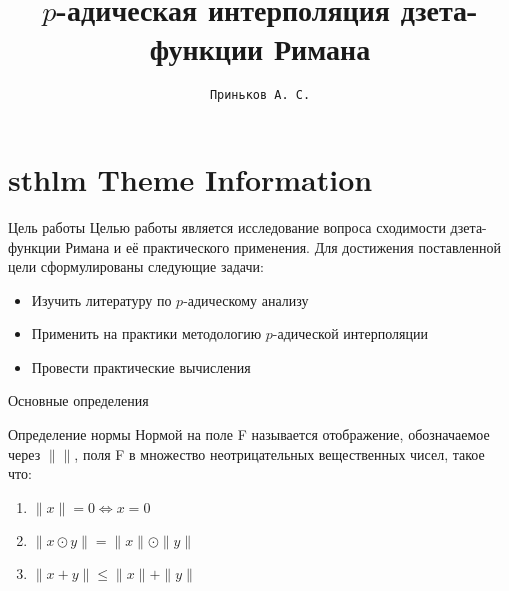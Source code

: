 \documentclass[newPxFont,sthlmFooter]{beamer}
\title{$p$-адическая интерполяция дзета-функции Римана}
\subtitle{}
\author{\texttt{Приньков А. С.}}
\institute{Липецк 2016}
\begin{document}
%
%

\maketitle


%
%

\section*{sthlm Theme Information}


\begin{frame}[c]{Цель работы}
Целью работы является исследование вопроса сходимости дзета-функции Римана и её практического применения.
Для достижения поставленной цели сформулированы следующие задачи:
\begin{itemize}
\item Изучить литературу по $p$-адическому анализу
\item Применить на практики методологию $p$-адической интерполяции
\item Провести практические вычисления
\end{itemize} 

\end{frame}


\begin{frame}[c]{Основные определения}
\begin{alertblock}{Определение нормы}
Нормой на поле F называется отображение, обозначаемое через $\| \|$, поля F в множество неотрицательных вещественных чисел, такое что:
\begin{enumerate}
\item $\|x\| = 0 \Leftrightarrow x = 0$
\item $\|x \odot y\| = \|x\| \odot \|y\|$
\item $\|x + y \| \leq \|x\| + \|y\|$
\end{enumerate}
\end{alertblock}


\end{frame}
\end{document}
